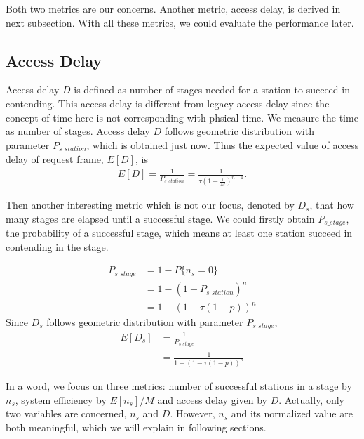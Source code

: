 Both two metrics are our concerns. Another metric, access delay, is derived in next subsection.
With all these metrics, we could evaluate the performance later.

	
\subsection{Access Delay}
Access delay $D$ is defined as number of stages needed for a station to succeed in contending.  
This access delay is different from legacy access delay since the concept of time here is not corresponding with phsical time.
We measure the time as number of stages.
Access delay $D$ follows geometric distribution with parameter $P_{s\_station}$, which is obtained just now.
Thus the expected value of access delay of request frame, $E[D]$, is 
\begin{align}
\label{equ_delay}
E[D] = \frac{1}{P_{s\_{station}}} = \frac{1}{\tau (1-\frac{\tau}{M})^{n-1}}.
\end{align}

Then another interesting metric which is not our focus, denoted by $D_s$, that how many stages are elapsed until a successful stage. 
We could firstly obtain $P_{s\_stage}$, the probability of a successful stage, which means at least one station succeed in contending in the stage.

\begin{align}
P_{s\_stage} &= 1-P\lbrace n_s = 0\rbrace \nonumber \\
	&= 1-(1-P_{s\_station})^n \nonumber\\
	&= 1-(1-\tau(1-p))^n
\end{align} 	 
Since $D_s$ follows geometric distribution with parameter $P_{s\_stage}$,  
\begin{align}
E[D_s] &= \frac{1}{P_{s\_stage}}  \nonumber \\
			&= \frac{1}{1-(1-\tau(1-p))^n}
\end{align} 

In a word, we focus on three metrics: number of successful stations in a stage by $n_s$, system efficiency by $E[n_s]/M$ and access delay given by $D$. 
Actually, only two variables are concerned, $n_s$ and $D$. However, $n_s$ and its normalized value are both meaningful, which we will explain in following sections.


